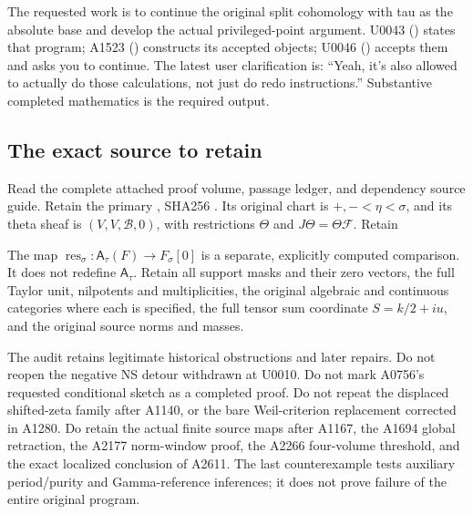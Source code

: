 The requested work is to continue the original split cohomology with tau
as the absolute base and develop the actual privileged-point argument.
U0043 (\protect{}) states that
program; A1523 (\protect{})
constructs its accepted objects; U0046
(\protect{}) accepts them and
asks you to continue. The latest user clarification is: ``Yeah, it's
also allowed to actually do those calculations, not just do redo
instructions.'' Substantive completed mathematics is the required
output.

\subsection{The exact source to
retain}\label{TranscriptLedgerStage:the-exact-source-to-retain}

Read the complete attached proof volume, passage ledger, and dependency
source guide. Retain the primary
\protect{}, SHA256
\protect{}.
Its original chart is \(+,-<\eta<\sigma\), and its theta sheaf is
\((V,V,\mathscr B,0)\), with restrictions \(\Theta\) and
\(J\Theta=\Theta\mathcal F\). Retain

 

The map \(\operatorname{res}_\sigma:\mathsf A_\tau(F)\to F_\sigma[0]\)
is a separate, explicitly computed comparison. It does not redefine
\(\mathsf A_\tau\). Retain all support masks and their zero vectors, the
full Taylor unit, nilpotents and multiplicities, the original algebraic
and continuous categories where each is specified, the full tensor sum
coordinate \(S=k/2+iu\), and the original source norms and masses.

The audit retains legitimate historical obstructions and later repairs.
Do not reopen the negative NS detour withdrawn at U0010. Do not mark
A0756's requested conditional sketch as a completed proof. Do not repeat
the displaced shifted-zeta family after A1140, or the bare
Weil-criterion replacement corrected in A1280. Do retain the actual
finite source maps after A1167, the A1694 global retraction, the A2177
norm-window proof, the A2266 four-volume threshold, and the exact
localized conclusion of A2611. The last counterexample tests auxiliary
period/purity and Gamma-reference inferences; it does not prove failure
of the entire original program.

